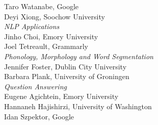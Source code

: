                                     \hspace*{0.2in} Taro Watanabe, Google \\
                                    \hspace*{0.2in} Deyi Xiong, Soochow University \\
                            \emph{NLP Applications} \\
                                    \hspace*{0.2in} Jinho Choi, Emory University \\
                                    \hspace*{0.2in} Joel Tetreault, Grammarly \\
                            \emph{Phonology, Morphology and Word Segmentation} \\
                                    \hspace*{0.2in} Jennifer Foster, Dublin City University \\
                                    \hspace*{0.2in} Barbara Plank, University of Groningen \\
                            \emph{Question Answering} \\
                                    \hspace*{0.2in} Eugene Agichtein, Emory University \\
                                    \hspace*{0.2in} Hannaneh Hajishirzi, University of Washington \\
                                    \hspace*{0.2in} Idan Szpektor, Google \\\pagebreak
                                    
